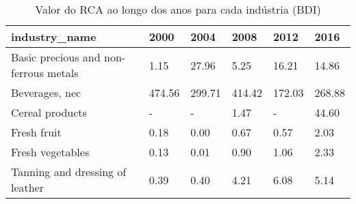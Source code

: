 \begin{table}
\centering
\caption{Valor do RCA ao longo dos anos para cada indústria (BDI)}
\begin{tabular}{p{6cm}p{1.5cm}p{1.5cm}p{1.5cm}p{1.5cm}p{1.5cm}}
\toprule
                        industry\_name &   2000 &   2004 &   2008 &   2012 &   2016 \\
\midrule
Basic precious and non-ferrous metals &   1.15 &  27.96 &   5.25 &  16.21 &  14.86 \\
                       Beverages, nec & 474.56 & 299.71 & 414.42 & 172.03 & 268.88 \\
                      Cereal products &      - &      - &   1.47 &      - &  44.60 \\
                          Fresh fruit &   0.18 &   0.00 &   0.67 &   0.57 &   2.03 \\
                     Fresh vegetables &   0.13 &   0.01 &   0.90 &   1.06 &   2.33 \\
      Tanning and dressing of leather &   0.39 &   0.40 &   4.21 &   6.08 &   5.14 \\
\bottomrule
\end{tabular}
\end{table}
